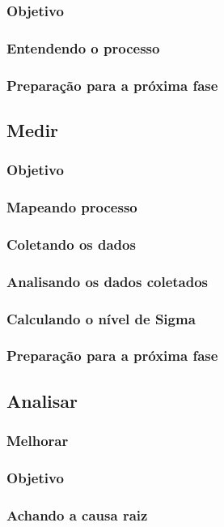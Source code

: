 \documentclass{abnt}
\begin{document}
					\subsubsection {Objetivo}
					\subsubsection {Entendendo o processo}
					\subsubsection {Preparação para a próxima fase}
				\subsection {Medir}
					\subsubsection {Objetivo}
					\subsubsection {Mapeando processo}
					\subsubsection {Coletando os dados}
					\subsubsection {Analisando os dados coletados}
					\subsubsection {Calculando o nível de Sigma}
					\subsubsection {Preparação para a próxima fase}
				\subsection {Analisar}
					\subsubsection {Melhorar}
					\subsubsection {Objetivo}
					\subsubsection {Achando a causa raiz}
\end{document}
